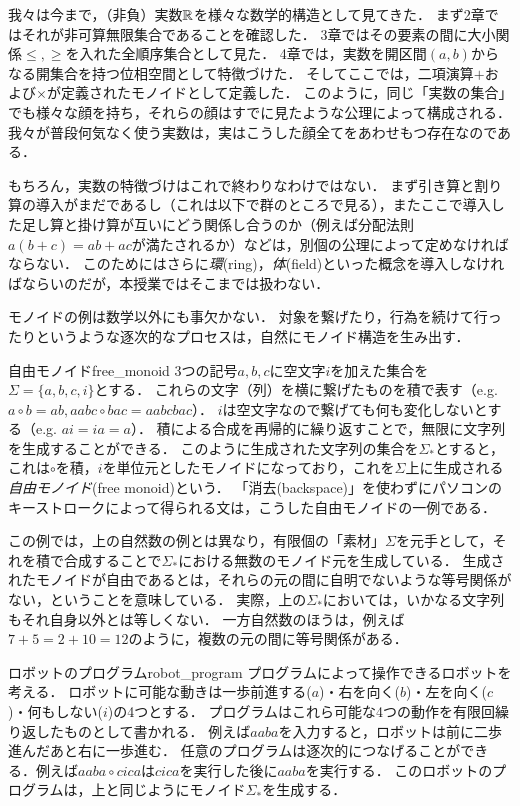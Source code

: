 \documentclass[11pt,a4paper, dvipdfmx]{jsarticle}
\begin{document}
\begin{develop}
我々は今まで，（非負）実数$\mathbb{R}$を様々な数学的構造として見てきた．
まず2章ではそれが非可算無限集合であることを確認した．
3章ではその要素の間に大小関係$\leq, \geq$を入れた全順序集合として見た．
4章では，実数を開区間$(a,b)$からなる開集合を持つ位相空間として特徴づけた．
そしてここでは，二項演算$+$および$\times$が定義されたモノイドとして定義した．
このように，同じ「実数の集合」でも様々な顔を持ち，それらの顔はすでに見たような公理によって構成される．
我々が普段何気なく使う実数は，実はこうした顔全てをあわせもつ存在なのである．

 もちろん，実数の特徴づけはこれで終わりなわけではない．
 まず引き算と割り算の導入がまだであるし（これは以下で群のところで見る），またここで導入した足し算と掛け算が互いにどう関係し合うのか（例えば分配法則$a(b+c) = ab + ac$が満たされるか）などは，別個の公理によって定めなければならない．
 このためにはさらに\emph{環}(ring)，\emph{体}(field)といった概念を導入しなければならいのだが，本授業ではそこまでは扱わない．
\end{develop}

モノイドの例は数学以外にも事欠かない．
対象を繋げたり，行為を続けて行ったりというような逐次的なプロセスは，自然にモノイド構造を生み出す．

\begin{rei}{自由モノイド}{free_monoid}
3つの記号$a, b, c$に空文字$i$を加えた集合を$\Sigma = \{a, b, c, i \}$とする．
これらの文字（列）を横に繋げたものを積で表す（e.g. $a \circ b = ab, aabc \circ bac = aabcbac$）．
$i$は空文字なので繋げても何も変化しないとする（e.g. $ai = ia = a$）．
積による合成を再帰的に繰り返すことで，無限に文字列を生成することができる．
このように生成された文字列の集合を$\Sigma_*$とすると，これは$\circ$を積，$i$を単位元としたモノイドになっており，これを$\Sigma$上に生成される\emph{自由モノイド}(free monoid)という．
「消去(backspace)」を使わずにパソコンのキーストロークによって得られる文は，こうした自由モノイドの一例である．
\end{rei}

この例では，上の自然数の例とは異なり，有限個の「素材」$\Sigma$を元手として，それを積で合成することで$\Sigma_*$における無数のモノイド元を生成している．
生成されたモノイドが自由であるとは，それらの元の間に自明でないような等号関係がない，ということを意味している．
実際，上の$\Sigma_*$においては，いかなる文字列もそれ自身以外とは等しくない．
一方自然数のほうは，例えば$7 + 5 = 2 + 10 = 12$のように，複数の元の間に等号関係がある．


\begin{rei}{ロボットのプログラム}{robot_program}
プログラムによって操作できるロボットを考える．
ロボットに可能な動きは一歩前進する($a$)・右を向く($b$)・左を向く($c$)・何もしない($i$)の4つとする．
プログラムはこれら可能な4つの動作を有限回繰り返したものとして書かれる．
例えば$aaba$を入力すると，ロボットは前に二歩進んだあと右に一歩進む．
任意のプログラムは逐次的につなげることができる．例えば$aaba \circ cica$は$cica$を実行した後に$aaba$を実行する．
このロボットのプログラムは，上と同じようにモノイド$\Sigma_*$を生成する．
\end{rei}
\end{document}
